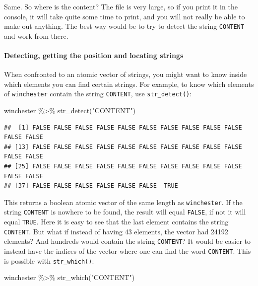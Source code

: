 \documentclass[
]{article}
\newenvironment{Shaded}{\begin{snugshade}}{\end{snugshade}}
\newcommand{\FunctionTok}[1]{\textcolor[rgb]{0.00,0.00,0.00}{#1}}
\newcommand{\NormalTok}[1]{#1}
\newcommand{\SpecialCharTok}[1]{\textcolor[rgb]{0.00,0.00,0.00}{#1}}
\newcommand{\StringTok}[1]{\textcolor[rgb]{0.31,0.60,0.02}{#1}}
\begin{document}
Same. So where is the content? The file is very large, so if you print it in the console, it will
take quite some time to print, and you will not really be able to make out anything. The best
way would be to try to detect the string \texttt{CONTENT} and work from there.

\hypertarget{detecting-getting-the-position-and-locating-strings}{%
\paragraph{Detecting, getting the position and locating strings}\label{detecting-getting-the-position-and-locating-strings}}

When confronted to an atomic vector of strings, you might want to know inside which elements you
can find certain strings. For example, to know which elements of \texttt{winchester} contain the string
\texttt{CONTENT}, use \texttt{str\_detect()}:

\begin{Shaded}
\begin{Highlighting}[]
\NormalTok{winchester }\SpecialCharTok{\%\textgreater{}\%}
  \FunctionTok{str\_detect}\NormalTok{(}\StringTok{"CONTENT"}\NormalTok{)}
\end{Highlighting}
\end{Shaded}

\begin{verbatim}
##  [1] FALSE FALSE FALSE FALSE FALSE FALSE FALSE FALSE FALSE FALSE FALSE FALSE
## [13] FALSE FALSE FALSE FALSE FALSE FALSE FALSE FALSE FALSE FALSE FALSE FALSE
## [25] FALSE FALSE FALSE FALSE FALSE FALSE FALSE FALSE FALSE FALSE FALSE FALSE
## [37] FALSE FALSE FALSE FALSE FALSE FALSE  TRUE
\end{verbatim}

This returns a boolean atomic vector of the same length as \texttt{winchester}. If the string \texttt{CONTENT} is
nowhere to be found, the result will equal \texttt{FALSE}, if not it will equal \texttt{TRUE}. Here it is easy to
see that the last element contains the string \texttt{CONTENT}. But what if instead of having 43 elements,
the vector had 24192 elements? And hundreds would contain the string \texttt{CONTENT}? It would be easier
to instead have the indices of the vector where one can find the word \texttt{CONTENT}. This is possible
with \texttt{str\_which()}:

\begin{Shaded}
\begin{Highlighting}[]
\NormalTok{winchester }\SpecialCharTok{\%\textgreater{}\%}
  \FunctionTok{str\_which}\NormalTok{(}\StringTok{"CONTENT"}\NormalTok{)}
\end{Highlighting}
\end{Shaded}
\end{document}
